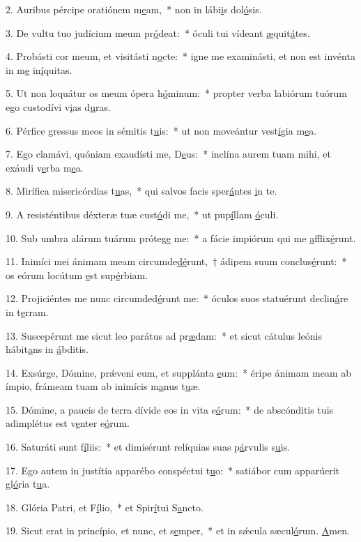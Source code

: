 2. Auribus pércipe oratiónem m\uline{e}am,~* non in lábi\uline{i}s dol\uline{ó}sis.\par 
3. De vultu tuo judícium meum pr\uline{ó}deat:~* óculi tui vídeant \uline{æ}quit\uline{á}tes.\par 
4. Probásti cor meum, et visitásti n\uline{o}cte:~* igne me examinásti, et non est invénta in m\uline{e} in\uline{í}quitas.\par 
5. Ut non loquátur os meum ópera h\uline{ó}minum:~* propter verba labiórum tuórum ego custodívi v\uline{i}as d\uline{u}ras.\par 
6. Pérfice gressus meos in sémitis t\uline{u}is:~* ut non moveántur vest\uline{í}gia m\uline{e}a.\par 
7. Ego clamávi, quóniam exaudísti me, D\uline{e}us:~* inclína aurem tuam mihi, et exáudi v\uline{e}rba m\uline{e}a.\par 
8. Mirífica misericórdias t\uline{u}as,~* qui salvos facis sper\uline{á}ntes \uline{i}n te.\par 
9. A resisténtibus déxteræ tuæ cust\uline{ó}di me,~* ut pup\uline{í}llam \uline{ó}culi.\par 
10. Sub umbra alárum tuárum próteg\uline{e} me:~* a fácie impiórum qui me \uline{a}fflix\uline{é}runt.\par 
11. Inimíci mei ánimam meam circumde\uline{dé}runt,~† ádipem suum conclus\uline{é}runt:~* os eórum locútum \uline{e}st sup\uline{é}rbiam.\par 
12. Projiciéntes me nunc circumded\uline{é}runt me:~* óculos suos statuérunt declin\uline{á}re in t\uline{e}rram.\par 
13. Suscepérunt me sicut leo parátus ad pr\uline{æ}dam:~* et sicut cátulus leónis hábit\uline{a}ns in \uline{á}bditis.\par 
14. Exsúrge, Dómine, prǽveni eum, et supplánta \uline{e}um:~* éripe ánimam meam ab ímpio, frámeam tuam ab inimícis m\uline{a}nus t\uline{u}æ.\par 
15. Dómine, a paucis de terra dívide eos in vita e\uline{ó}rum:~* de abscónditis tuis adimplétus est v\uline{e}nter e\uline{ó}rum.\par 
16. Saturáti sunt f\uline{í}liis:~* et dimisérunt relíquias suas p\uline{á}rvulis s\uline{u}is.\par 
17. Ego autem in justítia apparébo conspéctui t\uline{u}o:~* satiábor cum apparúerit gl\uline{ó}ria t\uline{u}a.\par 
18. Glória Patri, et F\uline{í}lio,~* et Spir\uline{í}tui S\uline{a}ncto.\par 
19. Sicut erat in princípio, et nunc, et s\uline{e}mper,~* et in sǽcula sæcul\uline{ó}rum. \uline{A}men.\par 
